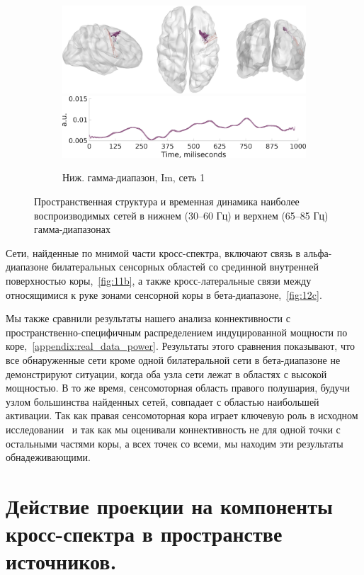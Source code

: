 \begin{figure}
 \begin{subfigure}[b]{0.4\textwidth}
 \includegraphics[width=\textwidth]{../images/psiicos_paper/Figure13_c1.jpg}
 \includegraphics[width=\textwidth]{../images/psiicos_paper/Figure13_c2.jpg}
 \caption{Ниж. гамма-диапазон, Im, сеть 1}\label{fig:13c}
 \end{subfigure}
 \caption{Пространственная структура и временная динамика наиболее воспроизводимых сетей в нижнем (30--60 Гц) и верхнем (65--85 Гц) гамма-диапазонах}\label{fig:13}
\end{figure} %

Сети, найденные по мнимой части кросс-спектра, включают связь в альфа-диапазоне
билатеральных сенсорных областей со срединной внутренней поверхностью
коры,~\ref{fig:11b}, а также кросс-латеральные связи между относящимися к руке
зонами сенсорной коры в бета-диапазоне,~\ref{fig:12c}.

Мы также сравнили результаты нашего анализа коннективности с
пространственно-специфичным распределением индуцированной мощности по
коре,~\ref{appendix:real_data_power}. Результаты этого сравнения показывают,
что все обнаруженные сети кроме одной билатеральной сети в бета-диапазоне не
демонстрируют ситуации, когда оба узла сети лежат в областях с высокой
мощностью. В то же время, сенсомоторная область правого полушария, будучи узлом
большинства найденных сетей, совпадает с областью наибольшей активации. Так как
правая сенсомоторная кора играет ключевую роль в исходном
исследовании~\cite{DeLange2008} и так как мы оценивали коннективность не для
одной точки с остальными частями коры, а всех точек со всеми, мы находим эти
результаты обнадеживающими.

\section{Действие проекции на компоненты кросс-спектра в пространстве источников.}\label{sec:subspaces_attenuation}

